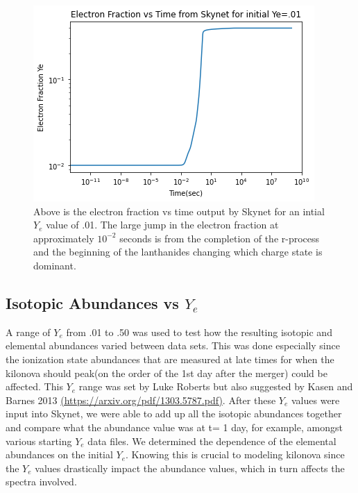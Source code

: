 \documentclass[11pt,a4paper]{article}
\begin{document}
\begin{figure}[h!]
  \includegraphics[scale = .75]{Ye_time.png}
  \centering
  \caption{Above is the electron fraction vs time output by Skynet for an intial $Y_e$ value of .01. The large jump in the electron fraction at approximately $10^{-2}$ seconds is from the completion of the r-process and the beginning of the lanthanides changing which charge state is dominant. }
\end{figure}


\subsection{Isotopic Abundances vs $Y_e$}

A range of $Y_e$ from .01 to .50 was used to test how the resulting isotopic and elemental abundances varied between data sets. This was done especially since the ionization state abundances that are measured at late times for when the kilonova should peak(on the order of the 1st day after the merger) could be affected. This $Y_e$ range was set by Luke Roberts but also suggested by Kasen and Barnes 2013 \url{(https://arxiv.org/pdf/1303.5787.pdf)}.
After these $Y_e$ values were input into Skynet, we were able to add up all the isotopic abundances together and compare what the abundance value was at t= 1 day, for example, amongst various starting $Y_e$ data files. We determined the dependence of the elemental abundances on the initial $Y_e$. Knowing this is crucial to modeling kilonova since the $Y_e$ values drastically impact the abundance values, which in turn affects the spectra involved.
\end{document}
